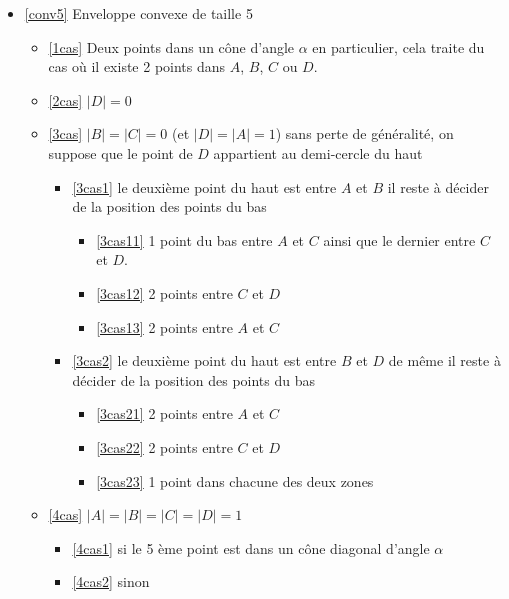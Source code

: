 \begin{itemize}
	\item \ref{conv5} Enveloppe convexe de taille 5
	\begin{itemize}
		\item \ref{1cas} Deux points dans un cône d'angle $\alpha$
		en particulier, cela traite du cas où il existe 2 points dans $A$, $B$, $C$ ou $D$.
		\item \ref{2cas} $|D| = 0$
		\item \ref{3cas} $|B| = |C| = 0$ (et $|D| = |A| = 1$)
		sans perte de généralité, on suppose que le point de $D$ appartient au demi-cercle du haut
		\begin{itemize}
			\item \ref{3cas1} le deuxième point du haut est entre $A$ et $B$
			il reste à décider de la position des points du bas
			\begin{itemize}
				\item \ref{3cas11} 1 point du bas entre $A$ et $C$ ainsi que le dernier entre $C$ et $D$.
				\item \ref{3cas12} 2 points entre $C$ et $D$
				\item \ref{3cas13} 2 points entre $A$ et $C$
			\end{itemize}
			\item \ref{3cas2} le deuxième point du haut est entre $B$ et $D$
			de même il reste à décider de la position des points du bas
			\begin{itemize}
				\item \ref{3cas21} 2 points entre $A$ et $C$
				\item \ref{3cas22} 2 points entre $C$ et $D$
				\item \ref{3cas23} 1 point dans chacune des deux zones
			\end{itemize}
		\end{itemize}
		\item \ref{4cas} $|A| = |B| = |C| = |D| = 1$
		\begin{itemize}
			\item \ref{4cas1} si le 5 ème point est dans un cône diagonal d'angle $\alpha$
			\item \ref{4cas2} sinon

\end{itemize}
\end{itemize}
\end{itemize}

